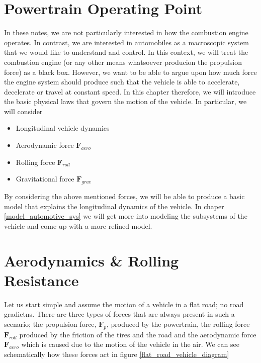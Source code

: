 \section{Powertrain Operating Point}
\label{power_train_op_point}
In these notes, we are not particularly interested in how the combustion engine operates. In contrast, we are interested in automobiles as a macroscopic system that we would
like to understand and control. In this context, we will treat the combustion engine (or any other means whatsoever producion the propulsion force) as a black box.
However, we want to be able to argue upon how much force the engine system should produce such that the vehicle is able to accelerate, decelerate or travel at constant speed.
In this chapter therefore, we will introduce the basic physical laws that govern the motion of the vehicle. In particular, we will consider

\begin{itemize}
\item Longitudinal vehicle dynamics
\item Aerodynamic force $\mathbf{F}_{aero}$
\item Rolling force $\mathbf{F}_{roll}$
\item Gravitational force $\mathbf{F}_{grav}$
\end{itemize}

By considering the above mentioned forces, we will be able to produce a basic model that explains the longitudinal dynamics of the vehicle. In chaper \ref{model_automotive_sys} we will get more into modeling the subsystems of the vehicle and come up with a more refined model.


\section{Aerodynamics \& Rolling Resistance}

Let us start simple and assume the motion of a vehicle in a flat road; no road gradietns. There are three types of forces that are always present in such a scenario; the propulsion force, $\mathbf{F}_{p}$, produced by the  powertrain, the rolling force $\mathbf{F}_{roll}$ produced by the friction of the tires and the road and the aerodynamic force  $\mathbf{F}_{aero}$ which is caused due to the motion of the vehicle in the air. We can see schematically how these forces act in figure \ref{flat_road_vehicle_diagram}

